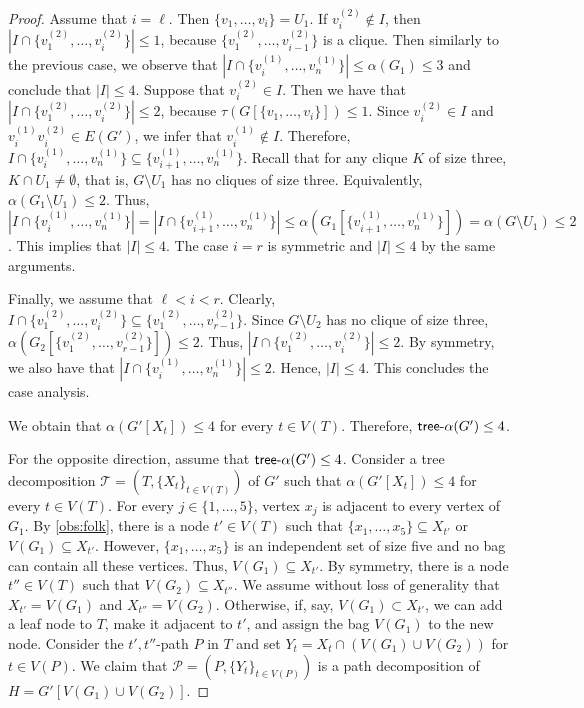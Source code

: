 \documentclass[11pt]{article}
\theoremstyle{definition}
\newcommand{\tin}{\mathsf{tree} \textnormal{-} \alpha}
\begin{document}
\begin{proof}
Assume that $i=\ell$. Then  $\{v_1,\ldots,v_i\}=U_1$. If $v_i^{(2)}\notin I$, then $|I\cap \{v_1^{(2)},\ldots,v_{i}^{(2)}\}|\leq 1$, because $\{v_1^{(2)},\ldots,v_{i-1}^{(2)}\}$ is a clique.
Then similarly to the previous case, we observe that $|I\cap \{v_i^{(1)},\ldots,v_n^{(1)}\}|\leq \alpha(G_1)\leq 3$ and conclude that $|I|\leq 4$. Suppose that $v_i^{(2)}\in I$. Then we have that $|I\cap \{v_1^{(2)},\ldots,v_{i}^{(2)}\}|\leq 2$, because $\tau(G[\{v_1,\ldots,v_i\}])\leq 1$.
Since $v_i^{(2)}\in I$ and $v_i^{(1)}v_i^{(2)}\in E(G')$, we infer that $v_i^{(1)}\notin I$.
Therefore, $I\cap \{v_i^{(1)},\ldots,v_n^{(1)}\}\subseteq \{v_{i+1}^{(1)},\ldots,v_n^{(1)}\}$. Recall that for any clique $K$ of size three, $K\cap U_1\neq\emptyset$, that is, $G\setminus U_1$ has no cliques of size three.
Equivalently, $\alpha(G_1\setminus U_1)\leq 2$.
Thus, $|I\cap  \{v_i^{(1)},\ldots,v_n^{(1)}\}|=|I\cap \{v_{i+1}^{(1)},\ldots,v_n^{(1)}\}|\leq
\alpha(G_1[\{v_{i+1}^{(1)},\ldots,v_n^{(1)}\}])=\alpha(G\setminus U_1)\leq 2$.
This implies that  $|I|\leq 4$.
The case $i=r$ is symmetric and $|I|\leq 4$ by the same arguments.

Finally, we assume that $\ell<i<r$. Clearly, $I\cap\{v_1^{(2)},\ldots,v_i^{(2)}\}\subseteq \{v_1^{(2)},\ldots,v_{r-1}^{(2)}\}$. Since $G\setminus U_2$ has no clique of size three,
$\alpha(G_2[\{v_1^{(2)},\ldots,v_{r-1}^{(2)}\}])\leq 2$. Thus, $|I\cap\{v_1^{(2)},\ldots,v_i^{(2)}\}|\leq 2$. By symmetry, we also have that $|I\cap\{v_i^{(1)},\ldots,v_n^{(1)}\}|\leq 2$.
Hence, $|I|\leq 4$. This concludes the case analysis.

We obtain that $\alpha(G'[X_t])\leq 4$ for every $t\in V(T)$. Therefore, $\tin(G')\leq 4$.

For the opposite direction, assume that $\tin(G')\leq 4$. Consider a tree decomposition $\mathcal{T} = (T, \{X_t\}_{t\in V(T)})$ of  $G'$ such that $\alpha(G'[X_t])\leq 4$ for every $t\in V(T)$.
For every $j\in\{1,\ldots,5\}$, vertex $x_j$ is adjacent to every vertex of~$G_1$. By \cref{obs:folk}, there is a node $t'\in V(T)$ such that $\{x_1,\ldots,x_5\}\subseteq X_{t'}$ or $V(G_1)\subseteq X_{t'}$.
However, $\{x_1,\ldots,x_5\}$ is an independent set of size five and no bag can contain all these vertices.
Thus, $V(G_1)\subseteq X_{t'}$.
By symmetry, there is a node $t''\in V(T)$ such that   $V(G_2)\subseteq X_{t''}$.
We assume without loss of generality that $X_{t'}=V(G_1)$ and $X_{t''}=V(G_2)$. Otherwise, if, say, $V(G_1)\subset X_{t'}$, we can add a leaf node to $T$, make it adjacent to $t'$, and assign the bag $V(G_1)$ to the new node.
Consider the $t',t''$-path $P$ in $T$ and set $Y_t=X_t\cap(V(G_1)\cup V(G_2))$ for $t\in V(P)$. We claim that
$\mathcal{P}=(P,\{Y_t\}_{t\in V(P)})$ is a path decomposition of $H=G'[V(G_1)\cup V(G_2)]$.


\end{proof}
\end{document}
